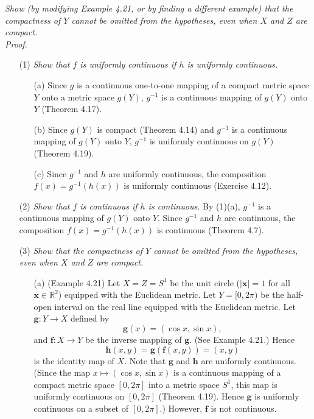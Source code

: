 \documentclass{article}
\begin{document}
\emph{Show (by modifying Example 4.21, or by finding a different example) that
the compactness of $Y$ cannot be omitted from the hypotheses,
even when $X$ and $Z$ are compact.} \\

\emph{Proof.}
\begin{enumerate}
\item[(1)]
\emph{Show that $f$ is uniformly continuous if $h$ is uniformly continuous.}
  \begin{enumerate}
  \item[(a)]
  Since $g$ is a continuous one-to-one mapping of a compact metric space $Y$
  onto a metric space $g(Y)$,
  $g^{-1}$ is a continuous mapping of $g(Y)$ onto $Y$ (Theorem 4.17).

  \item[(b)]
  Since $g(Y)$ is compact (Theorem 4.14) and
  $g^{-1}$ is a continuous mapping of $g(Y)$ onto $Y$,
  $g^{-1}$ is uniformly continuous on $g(Y)$ (Theorem 4.19).

  \item[(c)]
  Since $g^{-1}$ and $h$ are uniformly continuous,
  the composition $f(x) = g^{-1}(h(x))$ is uniformly continuous (Exercise 4.12).
  \end{enumerate}

\item[(2)]
\emph{Show that $f$ is continuous if $h$ is continuous.}
  By (1)(a), $g^{-1}$ is a continuous mapping of $g(Y)$ onto $Y$.
  Since $g^{-1}$ and $h$ are continuous,
  the composition $f(x) = g^{-1}(h(x))$ is continuous (Theorem 4.7).

\item[(3)]
\emph{Show that
the compactness of $Y$ cannot be omitted from the hypotheses,
even when $X$ and $Z$ are compact.}
  \begin{enumerate}
  \item[(a)]
  (Example 4.21)
  Let $X = Z = S^1$ be the unit circle
  ($|\mathbf{x}| = 1$ for all $\mathbf{x} \in \mathbb{R}^2$)
  equipped with the Euclidean metric.
  Let $Y = [0, 2\pi)$ be the half-open interval on the real line
  equipped with the Euclidean metric.
  Let $\mathbf{g}: Y \to X$ defined by
  \[
    \mathbf{g}(x) = (\cos x, \sin x),
  \]
  and $\mathbf{f}: X \to Y$ be the inverse mapping of $\mathbf{g}$.
  (See Example 4.21.)
  Hence
  \[
    \mathbf{h}(x,y) = \mathbf{g}(\mathbf{f}(x,y)) = (x,y)
  \]
  is the identity map of $X$.
  Note that $\mathbf{g}$ and $\mathbf{h}$ are uniformly continuous.
  (Since the map $x \mapsto (\cos x, \sin x)$ is a continuous mapping of
  a compact metric space $[0,2\pi]$ into a metric space $S^1$,
  this map is uniformly continuous on $[0,2\pi]$ (Theorem 4.19).
  Hence $\mathbf{g}$ is uniformly continuous on a subset of $[0,2\pi]$.)
  However, $\mathbf{f}$ is not continuous.


\end{enumerate}
\end{enumerate}
\end{document}
